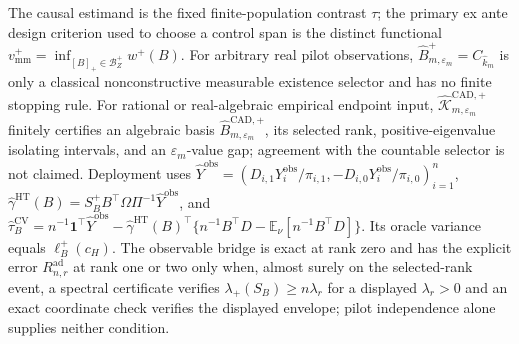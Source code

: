 The causal estimand is the fixed finite-population contrast \(\tau\); the primary ex ante design criterion used to choose a control span is the distinct functional \(v_{\mathrm{mm}}^+=\inf_{[B]_+\in\mathcal B_Z^+}w^+(B)\).  For arbitrary real pilot observations, \(\widehat B_{m,\varepsilon_m}^+=C_{\widehat k_m}\) is only a classical nonconstructive measurable existence selector and has no finite stopping rule.  For rational or real-algebraic empirical endpoint input, \(\widehat{\mathscr K}_{m,\varepsilon_m}^{\mathrm{CAD},+}\) finitely certifies an algebraic basis \(\widehat B_{m,\varepsilon_m}^{\mathrm{CAD},+}\), its selected rank, positive-eigenvalue isolating intervals, and an \(\varepsilon_m\)-value gap; agreement with the countable selector is not claimed.  Deployment uses \(\widehat Y^{\mathrm{obs}}=(D_{i,1}Y_i^{\mathrm{obs}}/\pi_{i,1},-D_{i,0}Y_i^{\mathrm{obs}}/\pi_{i,0})_{i=1}^n\), \(\widehat\gamma^{\mathrm{HT}}(B)=S_B^+B^{\top}\Omega\Pi^{-1}\widehat Y^{\mathrm{obs}}\), and \(\widehat\tau_B^{\mathrm{CV}}=n^{-1}\mathbf1^{\top}\widehat Y^{\mathrm{obs}}-\widehat\gamma^{\mathrm{HT}}(B)^{\top}\{n^{-1}B^{\top}D-\mathbb E_\nu[n^{-1}B^{\top}D]\}\).  Its oracle variance equals \(\ell_B^+(c_H)\).  The observable bridge is exact at rank zero and has the explicit error \(R_{n,r}^{\mathrm{ad}}\) at rank one or two only when, almost surely on the selected-rank event, a spectral certificate verifies \(\lambda_+(S_B)\ge n\lambda_r\) for a displayed \(\lambda_r>0\) and an exact coordinate check verifies the displayed envelope; pilot independence alone supplies neither condition.